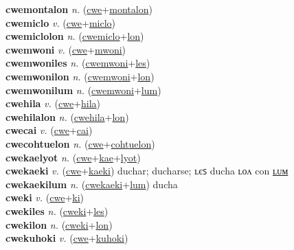 \textbf{cwemontalon} \textit{n.} (\hyperref[cwe]{cwe}+\hyperref[montalon]{montalon})
 \label{cwemontalon} \\
\textbf{cwemiclo} \textit{v.} (\hyperref[cwe]{cwe}+\hyperref[miclo]{miclo})
 \label{cwemiclo} \\
\textbf{cwemiclolon} \textit{n.} (\hyperref[cwemiclo]{cwemiclo}+\hyperref[lon]{lon})
 \label{cwemiclolon} \\
\textbf{cwemwoni} \textit{v.} (\hyperref[cwe]{cwe}+\hyperref[mwoni]{mwoni})
 \label{cwemwoni} \\
\textbf{cwemwoniles} \textit{n.} (\hyperref[cwemwoni]{cwemwoni}+\hyperref[les]{les})
 \label{cwemwoniles} \\
\textbf{cwemwonilon} \textit{n.} (\hyperref[cwemwoni]{cwemwoni}+\hyperref[lon]{lon})
 \label{cwemwonilon} \\
\textbf{cwemwonilum} \textit{n.} (\hyperref[cwemwoni]{cwemwoni}+\hyperref[lum]{lum})
 \label{cwemwonilum} \\
\textbf{cwehila} \textit{v.} (\hyperref[cwe]{cwe}+\hyperref[hila]{hila})
 \label{cwehila} \\
\textbf{cwehilalon} \textit{n.} (\hyperref[cwehila]{cwehila}+\hyperref[lon]{lon})
 \label{cwehilalon} \\
\textbf{cwecai} \textit{v.} (\hyperref[cwe]{cwe}+\hyperref[cai]{cai})
 \label{cwecai} \\
\textbf{cwecohtuelon} \textit{n.} (\hyperref[cwe]{cwe}+\hyperref[cohtuelon]{cohtuelon})
 \label{cwecohtuelon} \\
\textbf{cwekaelyot} \textit{n.} (\hyperref[cwe]{cwe}+\hyperref[kae]{kae}+\hyperref[lyot]{lyot})
 \label{cwekaelyot} \\
\textbf{cwekaeki} \textit{v.} (\hyperref[cwe]{cwe}+\hyperref[kaeki]{kaeki})
duchar; ducharse; ʟєꜱ ducha ʟᴏᴧ con \hyperref[cwekaekilum]{ʟᴜᴍ} \label{cwekaeki} \\
\textbf{cwekaekilum} \textit{n.} (\hyperref[cwekaeki]{cwekaeki}+\hyperref[lum]{lum})
ducha \label{cwekaekilum} \\
\textbf{cweki} \textit{v.} (\hyperref[cwe]{cwe}+\hyperref[ki]{ki})
 \label{cweki} \\
\textbf{cwekiles} \textit{n.} (\hyperref[cweki]{cweki}+\hyperref[les]{les})
 \label{cwekiles} \\
\textbf{cwekilon} \textit{n.} (\hyperref[cweki]{cweki}+\hyperref[lon]{lon})
 \label{cwekilon} \\
\textbf{cwekuhoki} \textit{v.} (\hyperref[cwe]{cwe}+\hyperref[kuhoki]{kuhoki})
 \label{cwekuhoki} \\
